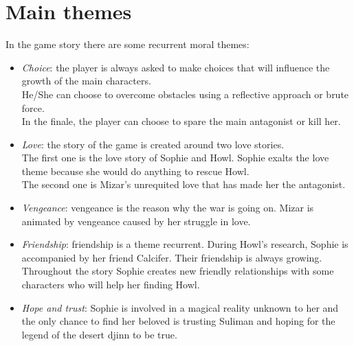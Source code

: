 \pagebreak %

\section{Main themes}

In the game story there are some recurrent moral themes:

\begin{itemize}
\item \textit{Choice}: the player is always asked to make choices that will influence the growth of the main characters. \\
  He/She can choose to overcome obstacles using a reflective approach or brute force. \\
  In the finale, the player can choose to spare the main antagonist or kill her.

\item \textit{Love}: the story of the game is created around two love stories. \\
  The first one is the love story of Sophie and Howl. Sophie exalts the love theme because she would do anything to rescue Howl. \\
  The second one is Mizar’s unrequited love that has made her the antagonist.

\item \textit{Vengeance}: vengeance is the reason why the war is going on. Mizar is animated by vengeance caused by her struggle in love.


\item \textit{Friendship}: friendship is a theme recurrent. During Howl's research, Sophie is accompanied by her friend Calcifer. Their friendship is always growing. Throughout the story Sophie creates new friendly relationships with some characters who will help her finding Howl.

\item \textit{Hope and trust}: Sophie is involved in a magical reality unknown to her and the only chance to find her beloved is trusting Suliman and hoping for the legend of the desert djinn  to be true.

\end{itemize}
